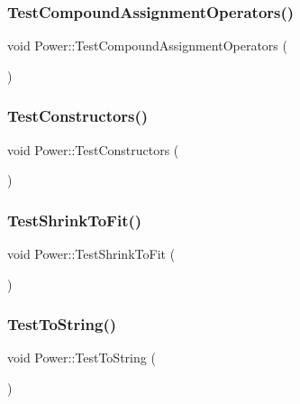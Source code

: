 \subsubsection{\texorpdfstring{Test\+Compound\+Assignment\+Operators()}{TestCompoundAssignmentOperators()}}
{\footnotesize\ttfamily void Power\+::\+Test\+Compound\+Assignment\+Operators (\begin{DoxyParamCaption}{ }\end{DoxyParamCaption})}

\mbox{\label{namespace_power_ac74fec7f3704b9c554276fa307de5bc5}} 
\subsubsection{\texorpdfstring{Test\+Constructors()}{TestConstructors()}}
{\footnotesize\ttfamily void Power\+::\+Test\+Constructors (\begin{DoxyParamCaption}{ }\end{DoxyParamCaption})}

\mbox{\label{namespace_power_ae23123cd183d3656e9fcdb0ca4b54aab}} 
\subsubsection{\texorpdfstring{Test\+Shrink\+To\+Fit()}{TestShrinkToFit()}}
{\footnotesize\ttfamily void Power\+::\+Test\+Shrink\+To\+Fit (\begin{DoxyParamCaption}{ }\end{DoxyParamCaption})}

\mbox{\label{namespace_power_a089aad37a74a89e886f605a3ea478664}} 
\subsubsection{\texorpdfstring{Test\+To\+String()}{TestToString()}}
{\footnotesize\ttfamily void Power\+::\+Test\+To\+String (\begin{DoxyParamCaption}{ }\end{DoxyParamCaption})}


